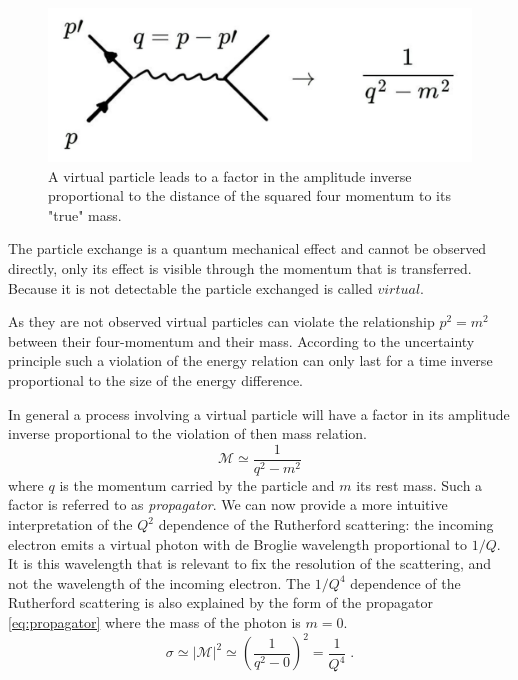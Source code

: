 \documentclass[12pt]{article}
\begin{document}
\begin{figure}
\begin{center}
\includegraphics[scale=0.2]{images/propagator.png}
\end{center}
\caption{A virtual particle leads to a factor in the amplitude inverse proportional to the distance of the squared four momentum to its "true" mass.}\label{fig:propagator}
\end{figure}
The particle exchange is a quantum mechanical effect and cannot be observed directly, only its effect is visible through the momentum that is transferred. Because it is not detectable the particle exchanged is called $virtual$. 

As they are not observed virtual particles can violate the relationship $p^2=m^2$ between their four-momentum and their mass. According to the uncertainty principle such a violation of the energy relation can only last for a time inverse proportional to the size of the energy difference. 

In general a process involving a virtual particle will have a factor in its amplitude inverse proportional to the violation of then mass relation. 
\begin{equation}\label{eq:propagator}
\mathcal{M}\simeq \frac{1}{q^2-m^2}
\end{equation}
where $q$ is the momentum carried by the particle and $m$ its rest mass. Such a factor is referred to as \emph{propagator}. We can now provide a more intuitive interpretation of the $Q^2$ dependence of the Rutherford scattering: the incoming electron emits a virtual photon with de Broglie wavelength proportional to $1/Q$. It is this wavelength that is relevant to fix the resolution of the scattering, and not the wavelength of the incoming electron. The $1/Q^4$ dependence of the Rutherford scattering is also explained by the form of the propagator \ref{eq:propagator} where the mass of the photon is $m=0$. 
\[\sigma\simeq |\mathcal{M}|^2\simeq \left(\frac{1}{q^2-0}\right)^2=\frac{1}{Q^4}\;.\]
%
%
\end{document}
